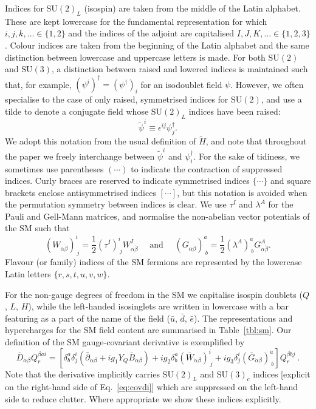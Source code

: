 Indices for $\mathrm{SU}(2)_{L}$ (isospin) are taken from the middle of the
Latin alphabet. These are kept lowercase for the fundamental representation for
which $i, j, k, \ldots \in \{1, 2\}$ and the indices of the adjoint are
capitalised $I, J, K, \ldots \in \{1, 2, 3\}$. Colour indices are taken from the
beginning of the Latin alphabet and the same distinction between lowercase and
uppercase letters is made. For both $\mathrm{SU}(2)$ and $\mathrm{SU}(3)$, a
distinction between raised and lowered indices is maintained such that, for
example, $(\psi^i)^\dagger = (\psi^\dagger)_i$ for an isodoublet field $\psi$.
However, we often specialise to the case of only raised, symmetrised indices for
$\mathrm{SU}(2)$, and use a tilde to denote a conjugate field whose
$\mathrm{SU}(2)_{L}$ indices have been raised:
\begin{equation}
  \label{eq:su2l-conj}
  \tilde{\psi}^{i} \equiv  \epsilon^{i j}\psi^{\dagger}_{j}.
\end{equation}
We adopt this notation from the usual definition of $\tilde{H}$, and note that
throughout the paper we freely interchange between $\tilde{\psi}^{i}$ and
$\psi^{\dagger}_{i}$. For the sake of tidiness, we sometimes use parentheses
$(\cdots)$ to indicate the contraction of suppressed indices. Curly braces are
reserved to indicate symmetrised indices $\{\cdots\}$ and square brackets
enclose antisymmetrised indices $[\cdots]$, but this notation is avoided when
the permutation symmetry between indices is clear. We use $\tau^I$ and
$\lambda^A$ for the Pauli and Gell-Mann matrices, and normalise the non-abelian
vector potentials of the SM such that
\begin{equation}
  (W_{\alpha \dot{\beta}})^i_{\ j} = \frac{1}{2} (\tau^I)^i_{\ j} W^I_{\alpha
    \dot{\beta}} \quad \text{ and } \quad (G_{\alpha \dot{\beta}})^a_{\ b} =
  \frac{1}{2} (\lambda^A)^a_{\ b} G^A_{\alpha \dot{\beta}}.
\end{equation}
Flavour (or family) indices of the SM fermions are represented by the lowercase
Latin letters $\{r, s, t, u, v, w\}$.

For the non-gauge degrees of freedom in the SM we capitalise isospin doublets
($Q$, $L$, $H$), while the left-handed isosinglets are written in lowercase with
a bar featuring as a part of the name of the field ($\bar{u}$, $\bar{d}$,
$\bar{e}$). The representations and hypercharges for the SM field content are
summarised in Table~\ref{tbl:sm}. Our definition of the SM gauge-covariant
derivative is exemplified by
\begin{equation}
  \label{eq:covdi}
  \bar{D}_{\dot{\alpha}\beta} Q^{\beta a i}_r = \left[ \delta^a_b \delta^i_j (\bar{\partial}_{\dot{\alpha}\beta} + i g_1 Y_Q \bar{B}_{\dot{\alpha} \beta}) + i g_2 \delta^a_b (\bar{W}_{\dot{\alpha} \beta})^i_{\ j} + i g_3 \delta^i_j (\bar{G}_{\dot{\alpha}\beta})^a_{\ b} \right] Q_r^{\beta b j} \ .
\end{equation}
Note that the derivative implicitly carries $\mathrm{SU}(2)_{L}$ and
$\mathrm{SU}(3)_{c}$ indices [explicit on the right-hand side of
Eq.~\eqref{eq:covdi}] which are suppressed on the left-hand side to reduce
clutter. Where appropriate we show these indices explicitly.

